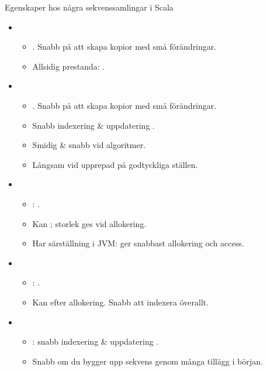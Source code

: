 \begin{Slide}{Egenskaper hos några sekvenssamlingar i Scala}
\vspace{-0.5em}
\begin{itemize}\SlideFontSmall

\item {}
  \begin{itemize}\SlideFontSmall
  \item {}. Snabb på att skapa kopior med små förändringar.
  \item Allsidig prestanda: .
  \end{itemize}

\item {}
  \begin{itemize}\SlideFontSmall
  \item {}. Snabb på att skapa kopior med små förändringar.
  \item Snabb indexering \& uppdatering .
  \item Smidig \& snabb vid  algoritmer.
  \item Långsam vid upprepad  på godtyckliga ställen.
  \end{itemize}

\item {}
  \begin{itemize}\SlideFontSmall
  \item {}: .
  \item Kan ; storlek ges vid allokering.
  \item Har särställning i JVM: ger snabbast allokering och access.
  \end{itemize}

\item {}
  \begin{itemize}\SlideFontSmall
  \item {}: .
  \item Kan  efter allokering. Snabb att indexera överallt.
  \end{itemize}

\item {}
  \begin{itemize}\SlideFontSmall
  \item {}: snabb indexering \& uppdatering .
  \item Snabb om du bygger upp sekvens genom många tillägg i början.
  \end{itemize}

\end{itemize}
\end{Slide}



